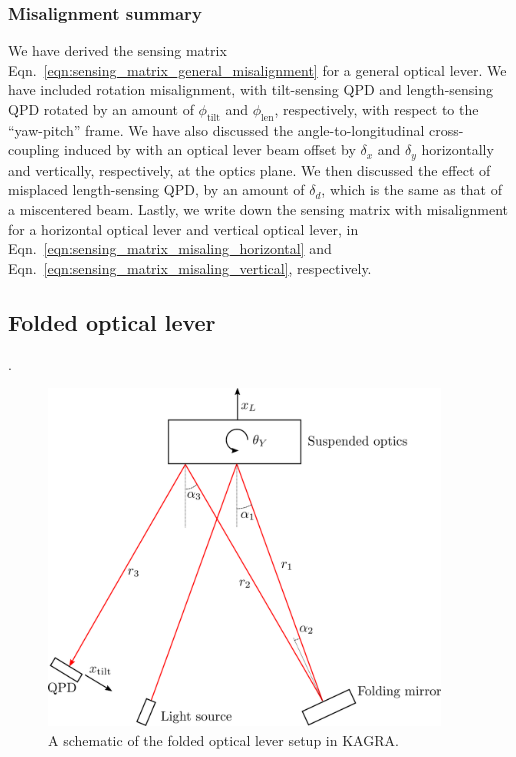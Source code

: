 \subsubsection{Misalignment summary}
We have derived the sensing matrix Eqn.~\eqref{eqn:sensing_matrix_general_misalignment} for a general optical lever.
We have included rotation misalignment, with tilt-sensing QPD and length-sensing QPD rotated by an amount of $\phi_\mathrm{tilt}$ and $\phi_\mathrm{len}$, respectively, with respect to the ``yaw-pitch'' frame.
We have also discussed the angle-to-longitudinal cross-coupling induced by with an optical lever beam offset by $\delta_x$ and $\delta_y$ horizontally and vertically, respectively, at the optics plane.
We then discussed the effect of misplaced length-sensing QPD, by an amount of $\delta_d$, which is the same as that of a miscentered beam.
Lastly, we write down the sensing matrix with misalignment for a horizontal optical lever and vertical optical lever, in Eqn.~\eqref{eqn:sensing_matrix_misaling_horizontal} and Eqn.~\eqref{eqn:sensing_matrix_misaling_vertical}, respectively.


\subsection{Folded optical lever}
.
\begin{figure}[!h]
	\centering
	\includegraphics[width=104mm]{figures/folded_optical_lever}
	\caption{A schematic of the folded optical lever setup in KAGRA.}
	\label{fig:foldedopticallever}
\end{figure}





